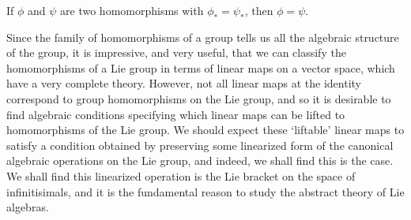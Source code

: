 \begin{fact}
    If $\phi$ and $\psi$ are two homomorphisms with $\phi_* = \psi_*$, then $\phi = \psi$.
\end{fact}

Since the family of homomorphisms of a group tells us all the algebraic structure of the group, it is impressive, and very useful, that we can classify the homomorphisms of a Lie group in terms of linear maps on a vector space, which have a very complete theory. However, not all linear maps at the identity correspond to group homomorphisms on the Lie group, and so it is desirable to find algebraic conditions specifying which linear maps can be lifted to homomorphisms of the Lie group. We should expect these `liftable' linear maps to satisfy a condition obtained by preserving some linearized form of the canonical algebraic operations on the Lie group, and indeed, we shall find this is the case. We shall find this linearized operation is the Lie bracket on the space of infinitisimals, and it is the fundamental reason to study the abstract theory of Lie algebras.

